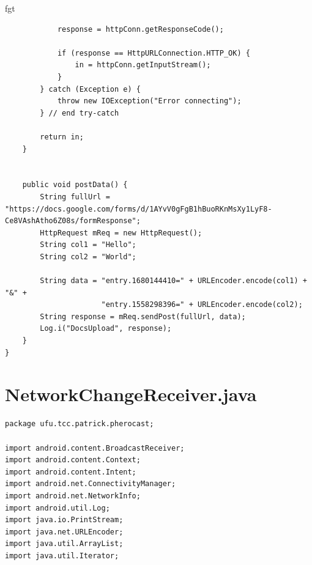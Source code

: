 fgt\documentclass[12pt, %
openright, 
oneside, %
a4paper,    %
brazil]{facom-ufu-abntex2}
\begin{document}
\begin{anexosenv}
\begin{lstlisting}
            response = httpConn.getResponseCode();                 

            if (response == HttpURLConnection.HTTP_OK) {
                in = httpConn.getInputStream();                                 
            }                     
        } catch (Exception e) {
            throw new IOException("Error connecting");            
        } // end try-catch

        return in;     
    }
    

	public void postData() {
		String fullUrl = "https://docs.google.com/forms/d/1AYvV0gFgB1hBuoRKnMsXy1LyF8-Ce8VAshAtho6Z08s/formResponse";
		HttpRequest mReq = new HttpRequest();
		String col1 = "Hello";
		String col2 = "World";

		String data = "entry.1680144410=" + URLEncoder.encode(col1) + "&" + 
					  "entry.1558298396=" + URLEncoder.encode(col2);
		String response = mReq.sendPost(fullUrl, data);
		Log.i("DocsUpload", response);
	} 
}

\end{lstlisting}
\section{NetworkChangeReceiver.java}
\begin{lstlisting}
package ufu.tcc.patrick.pherocast;

import android.content.BroadcastReceiver;
import android.content.Context;
import android.content.Intent;
import android.net.ConnectivityManager;
import android.net.NetworkInfo;
import android.util.Log;
import java.io.PrintStream;
import java.net.URLEncoder;
import java.util.ArrayList;
import java.util.Iterator;


\end{lstlisting}
\end{anexosenv}
\end{document}
